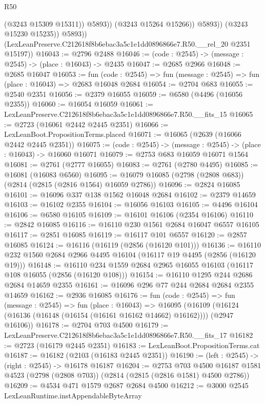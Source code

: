 \begin{lexlean}{R50}
\begin{coremodule}
                        (@3243 @15309 @15311))
                      @5893))
                  (@3243 @15264 @15266))
                @5893))
            (@3243 @15230 @15235))
          @5893))
      (LexLeanPreserve.C212618f8b6ebac3a5c1e1dd0896866e7.R50.__rel_20 @2351 @15197))
@16043 := @2796 @2488
@16046 := (code : @2545) -> (message : @2545) -> (place : @16043) -> @2435
@16047 := @2685 @2966
@16048 := @2685 @16047
@16053 := fun (code : @2545) => fun (message : @2545) => fun (place : @16043) => @2683 @16048 @2684
@16054 := @2704 @683
@16055 := @2540 @2351
@16056 := @2379 @16055
@16059 := @6580 (@4496 (@16056 @2355))
@16060 := @16054 @16059
@16061 := LexLeanPreserve.C212618f8b6ebac3a5c1e1dd0896866e7.R50.__fits_15
@16065 := @2723 (@16061 @2442 @2445 @2351)
@16066 := LexLeanBoot.PropositionTerms.placed
@16071 := @16065 (@2639 (@16066 @2442 @2445 @2351))
@16075 := (code : @2545) -> (message : @2545) -> (place : @16043) -> @16060 @16071
@16079 := @2753 @683 @16059 @16071 @1564
@16081 := @2761 (@2777 @16055)
@16083 := @2761 (@2780 @4495)
@16085 := @16081 (@16083 @6560)
@16095 := @16079 @16085 (@2798 (@2808 @683)) (@2814 (@2815 (@2816 @1564) @16059 @2786))
@16096 := @2824 @16085
@16101 := @16096 @337 @138 @1562 @16048 @2684
@16102 := @2379 @14659
@16103 := @16102 @2355
@16104 := @16056 @16103
@16105 := @4496 @16104
@16106 := @6580 @16105
@16109 := @16101 @16106 (@2354 @16106)
@16110 := @2842 @16085
@16116 := @16110 @230 @1561 @2684 @16047 @6557 @16105
@16117 := @2851 @16085
@16119 := @16117 @101 @6557
@16120 := @2857 @16085
@16124 := @16116 (@16119 (@2856 (@16120 @101)))
@16136 := @16110 @232 @1560 @2684 @2966 @4495 @16104 (@16117 @19 @4495 (@2856 (@16120 @19)))
@16148 := @16110 @234 @1559 @2684 @2965 @16055 @16103 (@16117 @108 @16055 (@2856 (@16120 @108)))
@16154 := @16110 @1295 @244 @2686 @2684 @14659 @2355
@16161 := @16096 @296 @77 @244 @2684 @2684 @2355 @14659
@16162 := @2936 @16085
@16176 := fun (code : @2545) =>
  fun (message : @2545) =>
  fun (place : @16043) =>
  @16095 (@16109 (@16124 (@16136 (@16148 (@16154 (@16161 @16162 @14662) @16162)))) (@2947 @16106))
@16178 := @2704 @703 @4500
@16179 := LexLeanPreserve.C212618f8b6ebac3a5c1e1dd0896866e7.R50.__fits_17
@16182 := @2723 (@16179 @2445 @2351)
@16183 := LexLeanBoot.PropositionTerms.cat
@16187 := @16182 (@2103 (@16183 @2445 @2351))
@16190 := (left : @2545) -> (right : @2545) -> @16178 @16187
@16204 := @2753
    @703
    @4500
    @16187
    @1581
    @4523
    (@2798 (@2808 @703))
    (@2814 (@2815 (@2816 @1581) @4500 @2786))
@16209 := @4534 @471 @1579 @2687 @2684 @4500
@16212 := @3000 @2545 LexLeanRuntime.instAppendableByteArray

\end{coremodule}
\end{lexlean}
